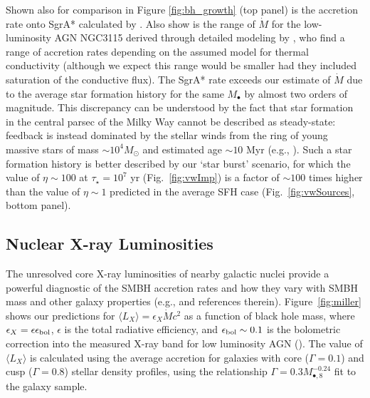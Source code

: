 \documentclass[usenatbib,fleqn]{mn2e}
\newcommand{\Mbheight}{M_{\bullet,8}}
\begin{document}

Shown also for comparison in Figure \ref{fig:bh_growth} (top panel) is
the accretion rate onto SgrA* calculated by \citet{Quataert:2004a}.
Also show is the range of $\dot{M}$ for the low-luminosity AGN NGC3115
derived through detailed modeling by \citealt{ShcherbakovWong+:2014a},
who find a range of accretion rates depending on the assumed model for
thermal conductivity (although we expect this range would be smaller
had they included saturation of the conductive flux).  The SgrA* rate
exceeds our estimate of $\dot{M}$ due to the average star formation
history for the same $M_{\bullet}$ by almost two orders of magnitude.
This discrepancy can be understood by the fact that star formation in
the central parsec of the Milky Way cannot be described as
steady-state: feedback is instead dominated by the stellar winds from
the ring of young massive stars of mass $\sim 10^{4}M_{\odot}$ and
estimated age $\sim 10$ Myr (e.g., \citealt{Schodel+07}).  Such a star
formation history is better described by our `star burst' scenario,
for which the value of $\eta \sim 100$ at $\tau_{\star} = 10^{7}$ yr
(Fig.~\ref{fig:vwImp}) is a factor of $\sim 100$ times higher than the
value of $\eta \sim 1$ predicted in the average SFH case
(Fig.~\ref{fig:vwSources}, bottom panel).


\subsection{Nuclear X-ray Luminosities}
\label{sec:Lx}

The unresolved core X-ray luminosities of nearby galactic nuclei provide a
powerful diagnostic of the SMBH accretion rates and how they vary with
SMBH mass and other galaxy properties (e.g., \citealt{Ho08} and
references therein).  Figure~\ref{fig:miller} shows our predictions
for $\langle L_{X} \rangle =\epsilon_X \dot{M} c^2$ as a function of
black hole mass, where $\epsilon_{X} = \epsilon\epsilon_{\rm bol}$,
$\epsilon$ is the total radiative efficiency, and $\epsilon_{\rm bol}
\sim 0.1$ is the bolometric correction into the measured X-ray band
for low luminosity AGN (\citealt{Ho08}).  The value of $\langle L_X
\rangle$ is calculated using the average accretion for galaxies with
core ($\Gamma = 0.1$) and cusp ($\Gamma = 0.8$) stellar density
profiles, using the relationship $\Gamma = 0.3 \Mbheight^{-0.24}$ fit
to the \citet{LauerFaber+:2007a} galaxy sample.
\end{document}
